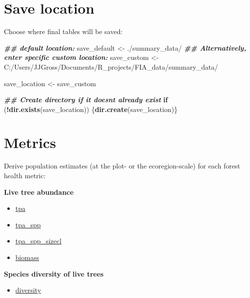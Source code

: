 \documentclass[
]{book}
\newenvironment{Shaded}{\begin{snugshade}}{\end{snugshade}}
\newcommand{\ControlFlowTok}[1]{\textcolor[rgb]{0.13,0.29,0.53}{\textbf{#1}}}
\newcommand{\DocumentationTok}[1]{\textcolor[rgb]{0.56,0.35,0.01}{\textbf{\textit{#1}}}}
\newcommand{\FunctionTok}[1]{\textcolor[rgb]{0.13,0.29,0.53}{\textbf{#1}}}
\newcommand{\NormalTok}[1]{#1}
\newcommand{\OtherTok}[1]{\textcolor[rgb]{0.56,0.35,0.01}{#1}}
\newcommand{\SpecialCharTok}[1]{\textcolor[rgb]{0.81,0.36,0.00}{\textbf{#1}}}
\newcommand{\StringTok}[1]{\textcolor[rgb]{0.31,0.60,0.02}{#1}}
\providecommand{\tightlist}{%
  \setlength{\itemsep}{0pt}\setlength{\parskip}{0pt}}
\begin{document}
\hypertarget{save-location-1}{%
\section{Save location}\label{save-location-1}}

Choose where final tables will be saved:

\begin{Shaded}
\begin{Highlighting}[]
\DocumentationTok{\#\# default location:}
\NormalTok{save\_default }\OtherTok{\textless{}{-}} \StringTok{\textquotesingle{}./summary\_data/\textquotesingle{}} 
\DocumentationTok{\#\# Alternatively, enter specific custom location:}
\NormalTok{save\_custom }\OtherTok{\textless{}{-}} \StringTok{\textquotesingle{}C:/Users/JJGross/Documents/R\_projects/FIA\_data/summary\_data/\textquotesingle{}}

\NormalTok{save\_location }\OtherTok{\textless{}{-}}\NormalTok{ save\_custom}

\DocumentationTok{\#\# Create directory if it doesn\textquotesingle{}t already exist}
\ControlFlowTok{if}\NormalTok{ (}\SpecialCharTok{!}\FunctionTok{dir.exists}\NormalTok{(save\_location)) \{}\FunctionTok{dir.create}\NormalTok{(save\_location)\}}
\end{Highlighting}
\end{Shaded}

\hypertarget{metrics}{%
\section{Metrics}\label{metrics}}

Derive population estimates (at the plot- or the ecoregion-scale) for each forest health metric:

\textbf{Live tree abundance}

\begin{itemize}
\tightlist
\item
  \protect\hyperlink{tpa}{tpa}
\item
  \protect\hyperlink{tpa_spp}{tpa\_spp}
\item
  \protect\hyperlink{tpa_spp_sizecl}{tpa\_spp\_sizecl}
\item
  \protect\hyperlink{biomass}{biomass}
\end{itemize}

\textbf{Species diversity of live trees}

\begin{itemize}
\tightlist
\item
  \protect\hyperlink{diversity}{diversity}
\end{itemize}
\end{document}
